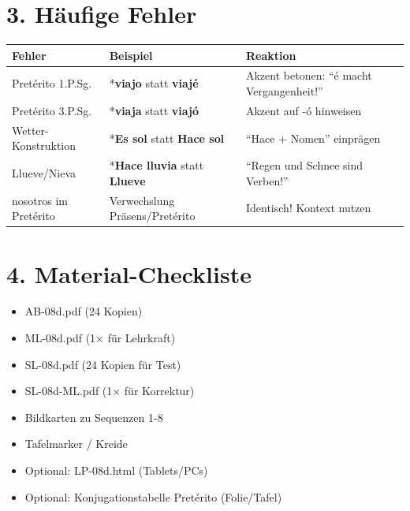 \documentclass[11pt, a4paper]{article}
\newcommand{\fachfarbe}{spanisch}
\newcommand{\lerngruppengroesse}{24}
\newcommand{\es}[1]{\textcolor{\fachfarbe}{\textbf{#1}}}
\begin{document}
\section*{3. Häufige Fehler}

\begin{fehlerbox}
\begin{tabularx}{\textwidth}{|l|X|X|}
\hline
\textbf{Fehler} & \textbf{Beispiel} & \textbf{Reaktion} \\
\hline
Pretérito 1.P.Sg. & *\es{viajo} statt \es{viajé} & Akzent betonen: ``é macht Vergangenheit!'' \\
\hline
Pretérito 3.P.Sg. & *\es{viaja} statt \es{viajó} & Akzent auf -ó hinweisen \\
\hline
Wetter-Konstruktion & *\es{Es sol} statt \es{Hace sol} & ``Hace + Nomen'' einprägen \\
\hline
Llueve/Nieva & *\es{Hace lluvia} statt \es{Llueve} & ``Regen und Schnee sind Verben!'' \\
\hline
nosotros im Pretérito & Verwechslung Präsens/Pretérito & Identisch! Kontext nutzen \\
\hline
\end{tabularx}
\end{fehlerbox}


\section*{4. Material-Checkliste}

\begin{materialbox}
\begin{itemize}[label=$\square$]
    \item AB-08d.pdf (\lerngruppengroesse{} Kopien)
    \item ML-08d.pdf (1× für Lehrkraft)
    \item SL-08d.pdf (\lerngruppengroesse{} Kopien für Test)
    \item SL-08d-ML.pdf (1× für Korrektur)
    \item Bildkarten zu Sequenzen 1-8
    \item Tafelmarker / Kreide
    \item Optional: LP-08d.html (Tablets/PCs)
    \item Optional: Konjugationstabelle Pretérito (Folie/Tafel)
\end{itemize}
\end{materialbox}
\end{document}

